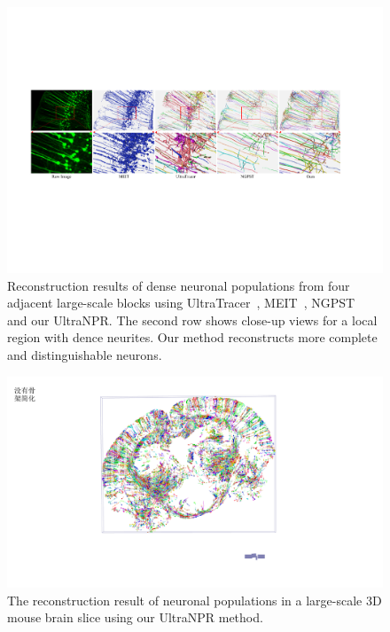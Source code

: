 \begin{figure}[t]
	\centering
	\includegraphics[width=\textwidth]{./Illustrations/comparison_ultranpr.pdf}
	\caption{Reconstruction results of dense neuronal populations from four adjacent large-scale blocks using UltraTracer~\cite{Peng2017}, MEIT~\cite{Wang2018}, NGPST~\cite{Quan2015} and our UltraNPR. The second row shows close-up views for a local region with dence neurites. Our method reconstructs more complete and distinguishable neurons. 
	}
	\label{fig:reconstruct_blocks}
\end{figure}

\begin{figure}[t]
	\centering
	\includegraphics[width=1\columnwidth]{./Illustrations/brain_slice.pdf}
	\caption{The reconstruction result of neuronal populations in a large-scale 3D mouse brain slice using our UltraNPR method.}
	\label{fig:reconstruct_brain}
\end{figure}

